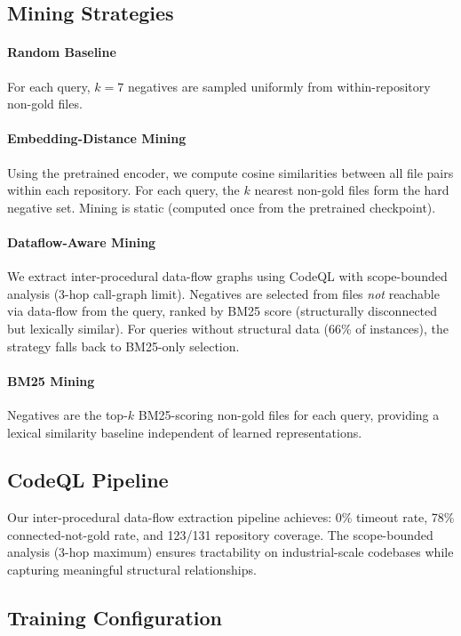 \documentclass[11pt,a4paper]{article}
\begin{document}
\subsection{Mining Strategies}

\paragraph{Random Baseline}
For each query, $k=7$ negatives are sampled uniformly from within-repository non-gold files.

\paragraph{Embedding-Distance Mining}
Using the pretrained encoder, we compute cosine similarities between all file pairs within each repository.
For each query, the $k$ nearest non-gold files form the hard negative set.
Mining is static (computed once from the pretrained checkpoint).

\paragraph{Dataflow-Aware Mining}
We extract inter-procedural data-flow graphs using CodeQL with scope-bounded analysis (3-hop call-graph limit).
Negatives are selected from files \textit{not} reachable via data-flow from the query, ranked by BM25 score (structurally disconnected but lexically similar).
For queries without structural data (66\% of instances), the strategy falls back to BM25-only selection.

\paragraph{BM25 Mining}
Negatives are the top-$k$ BM25-scoring non-gold files for each query, providing a lexical similarity baseline independent of learned representations.

\subsection{CodeQL Pipeline}

Our inter-procedural data-flow extraction pipeline achieves: 0\% timeout rate, 78\% connected-not-gold rate, and 123/131 repository coverage.
The scope-bounded analysis (3-hop maximum) ensures tractability on industrial-scale codebases while capturing meaningful structural relationships.

\subsection{Training Configuration}
\end{document}
